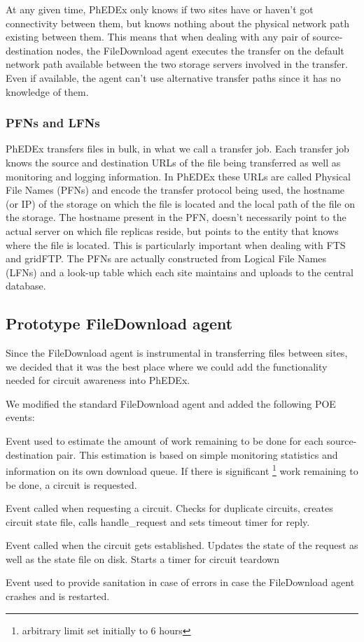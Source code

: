 At any given time, PhEDEx only knows if two sites have or haven't got connectivity
between them, but knows nothing about the physical network path existing between
them. This means that when dealing with any pair of source-destination nodes, 
the FileDownload agent executes the transfer on the default network path available 
between the two storage servers involved in the transfer. Even if available, the agent
 can't use alternative transfer paths since it has no knowledge of them.

\subsubsection{PFNs and LFNs}

PhEDEx transfers files in bulk, in what we call a transfer job. Each transfer job
knows the source and destination URLs of the file being transferred as well as 
monitoring and logging information. In PhEDEx these URLs are called Physical
File Names (PFNs) and encode the transfer protocol being used, the hostname (or IP)
of the storage on which the file is located and the local path of the file
on the storage. 
The hostname present in the PFN, doesn't necessarily point to the
actual server on which file replicas reside, but points to the entity that knows where 
the file is located. This is particularly important when dealing with FTS and gridFTP.
The PFNs are actually constructed from Logical File Names (LFNs) and a look-up table
which each site maintains and uploads to the central database.

\subsection{Prototype FileDownload agent}

Since the FileDownload agent is instrumental in transferring files between sites, we 
decided that it was the best place where we could add the functionality needed for 
circuit awareness into PhEDEx.

We modified the standard FileDownload agent and added the following POE events:
\begin{description}[style=unboxed,leftmargin=0cm]
  \item[check\_workload:] Event used to estimate the amount of work remaining to be done
  for each source-destination pair. This estimation is based on simple monitoring 
  statistics and information on its own download queue. If there is significant
  \footnote{arbitrary limit set initially to 6 hours} work remaining to be done, 
  a circuit is requested.
  \item[request\_circuit:] Event called when requesting a circuit. Checks for duplicate circuits, 
  creates circuit state file, calls handle\_request and sets timeout timer for reply.
  \item[handle\_request:] Event called when the circuit gets established. Updates the
  state of the request as well as the state file on disk. Starts a timer for circuit teardown
  \item[check\_circuit\_setup:] Event used to provide sanitation in case of errors in case
  the FileDownload agent crashes and is restarted.
\end{description}

